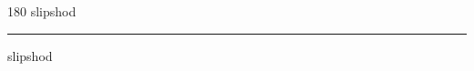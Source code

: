 
\begin{frame}
\begin{center}
\begin{turn}{180}
{\fontsize{2.5cm}{1em}\selectfont slipshod}
\end{turn}
\vspace{1em}\par  
\hrule
\vspace{1em}\par  
{\fontsize{2.5cm}{1em}\selectfont slipshod}
\end{center}
\end{frame}
